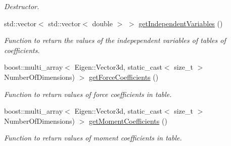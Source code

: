 \begin{DoxyCompactItemize}
\begin{DoxyCompactList}\small\item\em Destructor. \end{DoxyCompactList}\item 
std\+::vector$<$ std\+::vector$<$ double $>$ $>$ \hyperlink{classtudat_1_1simulation__setup_1_1TabulatedControlSurfaceIncrementAerodynamicCoefficientSettings_a0e5581659e64b17b88a26fbf3af23270}{get\+Independent\+Variables} ()
\begin{DoxyCompactList}\small\item\em Function to return the values of the indepependent variables of tables of coefficients. \end{DoxyCompactList}\item 
boost\+::multi\+\_\+array$<$ Eigen\+::\+Vector3d, static\+\_\+cast$<$ size\+\_\+t $>$ Number\+Of\+Dimensions) $>$ \hyperlink{classtudat_1_1simulation__setup_1_1TabulatedControlSurfaceIncrementAerodynamicCoefficientSettings_aad5c27ba4ae94181a6833c18ddd81595}{get\+Force\+Coefficients} ()
\begin{DoxyCompactList}\small\item\em Function to return values of force coefficients in table. \end{DoxyCompactList}\item 
boost\+::multi\+\_\+array$<$ Eigen\+::\+Vector3d, static\+\_\+cast$<$ size\+\_\+t $>$ Number\+Of\+Dimensions) $>$ \hyperlink{classtudat_1_1simulation__setup_1_1TabulatedControlSurfaceIncrementAerodynamicCoefficientSettings_ab5eb9a8a55972b8a64b155c2db096ebb}{get\+Moment\+Coefficients} ()
\begin{DoxyCompactList}\small\item\em Function to return values of moment coefficients in table. \end{DoxyCompactList}\end{DoxyCompactItemize}

